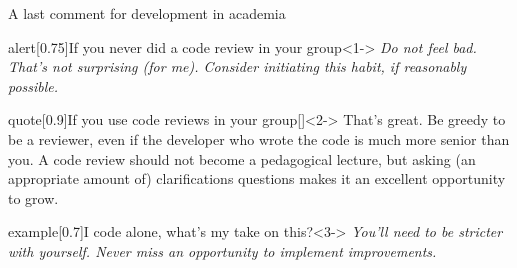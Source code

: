 \begin{frame}{A last comment for development in academia}
    \begin{varblock}{alert}[0.75\textwidth]{If you never did a code review in your group}<1->
        \itshape\small
        Do not feel bad.
        That's not surprising (for me).
        Consider initiating this habit, if reasonably possible.
    \end{varblock}
    \begin{varblock}{quote}[0.9\textwidth]{If you use code reviews in your group}[]<2->
        That's great.
        Be greedy to be a reviewer, even if the developer who wrote the code is much more senior than you.
        A code review should not become a pedagogical lecture, but asking (an appropriate amount of) clarifications questions makes it an excellent opportunity to grow.
    \end{varblock}
    \begin{varblock}{example}[0.7\textwidth]{I code alone, what's my take on this?}<3->
        \itshape\small
        You'll need to be stricter with yourself.
        Never miss an opportunity to implement improvements.
    \end{varblock}
\end{frame}


